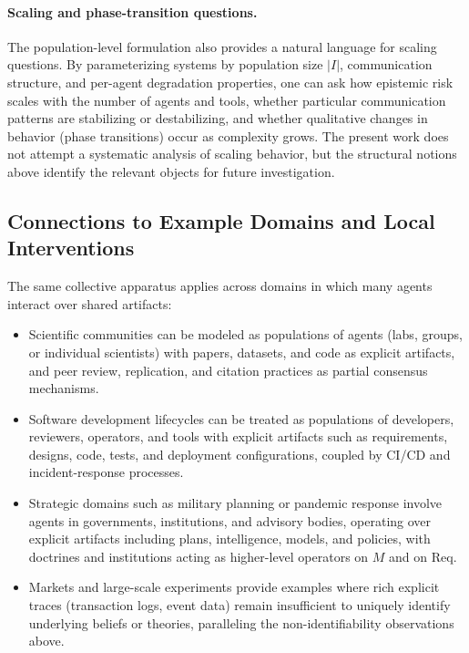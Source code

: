 \documentclass[11pt]{article}
\theoremstyle{definition}
\begin{document}
\paragraph{Scaling and phase-transition questions.}

The population-level formulation also provides a natural language for
scaling questions. By parameterizing systems by population size $|I|$,
communication structure, and per-agent degradation properties, one can ask
how epistemic risk scales with the number of agents and tools, whether
particular communication patterns are stabilizing or destabilizing, and
whether qualitative changes in behavior (phase transitions) occur as
complexity grows. The present work does not attempt a systematic analysis
of scaling behavior, but the structural notions above identify the relevant
objects for future investigation.

\subsection{Connections to Example Domains and Local Interventions}

The same collective apparatus applies across domains in which many agents
interact over shared artifacts:

\begin{itemize}
  \item Scientific communities can be modeled as populations of agents
        (labs, groups, or individual scientists) with papers, datasets, and
        code as explicit artifacts, and peer review, replication, and
        citation practices as partial consensus mechanisms.
  \item Software development lifecycles can be treated as populations of
        developers, reviewers, operators, and tools with explicit artifacts
        such as requirements, designs, code, tests, and deployment
        configurations, coupled by CI/CD and incident-response processes.
  \item Strategic domains such as military planning or pandemic response
        involve agents in governments, institutions, and advisory bodies,
        operating over explicit artifacts including plans, intelligence,
        models, and policies, with doctrines and institutions acting as
        higher-level operators on $M$ and on $\mathrm{Req}$.
  \item Markets and large-scale experiments provide examples where rich
        explicit traces (transaction logs, event data) remain insufficient
        to uniquely identify underlying beliefs or theories, paralleling
        the non-identifiability observations above.
\end{itemize}
\end{document}
